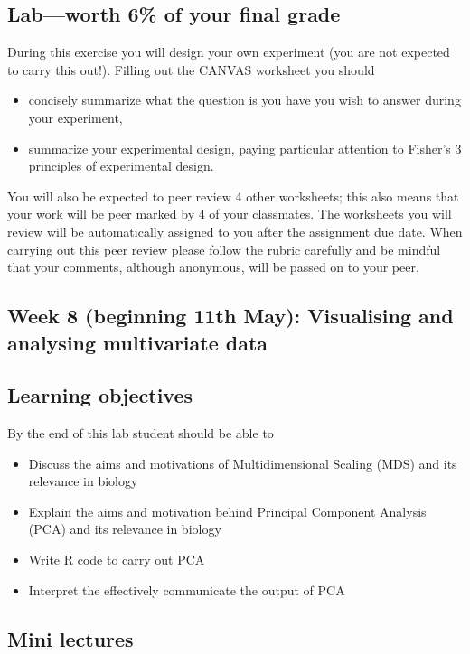 \documentclass{article}
\begin{document}
\subsection*{Lab---worth 6\% of your final grade}

During this exercise you will design your own experiment (you are not expected to carry this out!). Filling out the CANVAS worksheet you should 

\begin{itemize}
\item concisely summarize what the question is you have you wish to answer during your experiment,

\item summarize your experimental design, paying particular attention to Fisher's 3 principles of experimental design.
\end{itemize}

You will also be expected to peer review 4 other worksheets; this also means that your work will be peer marked by 4 of your classmates. The worksheets you will review will be automatically assigned to you after the assignment due date. When carrying out this peer review please follow the rubric carefully and be mindful that your comments, although anonymous, will be passed on to your peer.


\newpage

\subsection*{Week 8 (beginning 11th May): Visualising and analysing multivariate data}
\subsection*{Learning objectives}
By the end of this lab student should be able to
\begin{itemize}
\item Discuss the aims and motivations of Multidimensional Scaling (MDS) and its relevance in biology
   \item Explain the aims and motivation behind Principal Component Analysis (PCA) and its relevance in biology
   \item Write R code to carry out PCA
   \item Interpret the effectively communicate the output of PCA
\end{itemize}

\subsection*{Mini lectures}
\end{document}
